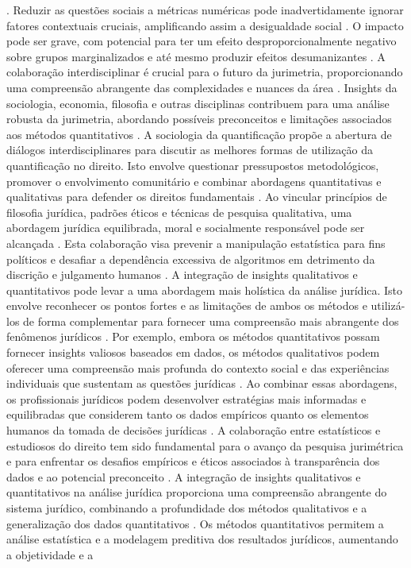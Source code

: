 \cite{10.1057/s41599-020-00557-0,10.1057/s41599-020-0396-5}. Reduzir as questões sociais a métricas numéricas pode inadvertidamente ignorar fatores contextuais cruciais, amplificando assim a desigualdade social \cite{10.1057/s41599-020-00557-0,10.1057/s41599-020-0396-5}. O impacto pode ser grave, com potencial para ter um efeito desproporcionalmente negativo sobre grupos marginalizados e até mesmo produzir efeitos desumanizantes \cite{10.1057/s41599-020-0396-5,10.1057/s41599-020-00557-0}. A colaboração interdisciplinar é crucial para o futuro da jurimetria, proporcionando uma compreensão abrangente das complexidades e nuances da área \cite{silva2023role,nunes2016jurimetria}. Insights da sociologia, economia, filosofia e outras disciplinas contribuem para uma análise robusta da jurimetria, abordando possíveis preconceitos e limitações associados aos métodos quantitativos \cite{silva2023role,nunes2016jurimetria}. A sociologia da quantificação propõe a abertura de diálogos interdisciplinares para discutir as melhores formas de utilização da quantificação no direito. Isto envolve questionar pressupostos metodológicos, promover o envolvimento comunitário e combinar abordagens quantitativas e qualitativas para defender os direitos fundamentais \cite{10.1007/s11186-021-09453-1,1023071190721}. Ao vincular princípios de filosofia jurídica, padrões éticos e técnicas de pesquisa qualitativa, uma abordagem jurídica equilibrada, moral e socialmente responsável pode ser alcançada \cite{10.1007/s11186-021-09453-1,1023071190721}. Esta colaboração visa prevenir a manipulação estatística para fins políticos e desafiar a dependência excessiva de algoritmos em detrimento da discrição e julgamento humanos \cite{10.1007/s11186-021-09453-1,1023071190721}. A integração de insights qualitativos e quantitativos pode levar a uma abordagem mais holística da análise jurídica. Isto envolve reconhecer os pontos fortes e as limitações de ambos os métodos e utilizá-los de forma complementar para fornecer uma compreensão mais abrangente dos fenômenos jurídicos \cite{10.1057/s41599-020-00557-0}. Por exemplo, embora os métodos quantitativos possam fornecer insights valiosos baseados em dados, os métodos qualitativos podem oferecer uma compreensão mais profunda do contexto social e das experiências individuais que sustentam as questões jurídicas \cite{10.1057/s41599-020-00557-0}. Ao combinar essas abordagens, os profissionais jurídicos podem desenvolver estratégias mais informadas e equilibradas que considerem tanto os dados empíricos quanto os elementos humanos da tomada de decisões jurídicas \cite{10.1057/s41599-020-00557-0}. A colaboração entre estatísticos e estudiosos do direito tem sido fundamental para o avanço da pesquisa jurimétrica e para enfrentar os desafios empíricos e éticos associados à transparência dos dados e ao potencial preconceito \cite{10.1007/s11186-021-09453-1,10.3390/fi9040068}. A integração de insights qualitativos e quantitativos na análise jurídica proporciona uma compreensão abrangente do sistema jurídico, combinando a profundidade dos métodos qualitativos e a generalização dos dados quantitativos \cite{ribeiro2021,restrepoamariles2015}. Os métodos quantitativos permitem a análise estatística e a modelagem preditiva dos resultados jurídicos, aumentando a objetividade e a 